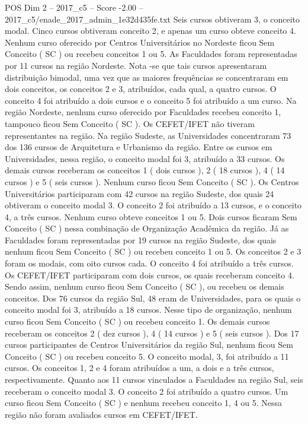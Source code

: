 \begin{textsample}{POS Dim 2 – 2017\_c5 – Score -2.00 – 2017\_c5/enade\_2017\_admin\_1e32d435fe.txt}
Seis cursos obtiveram 3, o conceito modal.
Cinco cursos obtiveram conceito 2, e apenas um curso obteve conceito 4.
Nenhum curso oferecido por Centros Universitários no Nordeste ficou Sem Conceito ( SC ) ou recebeu conceitos 1 ou 5.
As Faculdades foram representadas por 11 cursos na região Nordeste.
Nota -se que tais cursos apresentaram distribuição bimodal, uma vez que as maiores frequências se concentraram em dois conceitos, os conceitos 2 e 3, atribuídos, cada qual, a quatro cursos.
O conceito 4 foi atribuído a dois cursos e o conceito 5 foi atribuído a um curso.
Na região Nordeste, nenhum curso oferecido por Faculdades recebeu conceito 1, tampouco ficou Sem Conceito ( SC ).
Os CEFET/IFET não tiveram representantes na região.
Na região Sudeste, as Universidades concentraram 73 dos 136 cursos de Arquitetura e Urbanismo da região.
Entre os cursos em Universidades, nessa região, o conceito modal foi 3, atribuído a 33 cursos.
Os demais cursos receberam os conceitos 1 ( dois cursos ), 2 ( 18 cursos ), 4 ( 14 cursos ) e 5 ( seis cursos ).
Nenhum curso ficou Sem Conceito ( SC ).
Os Centros Universitários participaram com 42 cursos na região Sudeste, dos quais 24 obtiveram o conceito modal 3.
O conceito 2 foi atribuído a 13 cursos, e o conceito 4, a três cursos.
Nenhum curso obteve conceitos 1 ou 5.
Dois cursos ficaram Sem Conceito ( SC ) nessa combinação de Organização Acadêmica da região.
Já as Faculdades foram representadas por 19 cursos na região Sudeste, dos quais nenhum ficou Sem Conceito ( SC ) ou recebeu conceito 1 ou 5.
Os conceitos 2 e 3 foram os modais, com oito cursos cada.
O conceito 4 foi atribuído a três cursos.
Os CEFET/IFET participaram com dois cursos, os quais receberam conceito 4.
Sendo assim, nenhum curso ficou Sem Conceito ( SC ), ou recebeu os demais conceitos.
Dos 76 cursos da região Sul, 48 eram de Universidades, para os quais o conceito modal foi 3, atribuído a 18 cursos.
Nesse tipo de organização, nenhum curso ficou Sem Conceito ( SC ) ou recebeu conceito 1.
Os demais cursos receberam os conceitos 2 ( dez cursos ), 4 ( 14 cursos ) e 5 ( seis cursos ).
Dos 17 cursos participantes de Centros Universitários da região Sul, nenhum ficou Sem Conceito ( SC ) ou recebeu conceito 5.
O conceito modal, 3, foi atribuído a 11 cursos.
Os conceitos 1, 2 e 4 foram atribuídos a um, a dois e a três cursos, respectivamente.
Quanto aos 11 cursos vinculados a Faculdades na região Sul, seis receberam o conceito modal 3.
O conceito 2 foi atribuído a quatro cursos.
Um curso ficou Sem Conceito ( SC ) e nenhum recebeu conceito 1, 4 ou 5.
Nessa região não foram avaliados cursos em CEFET/IFET.

\end{textsample}

